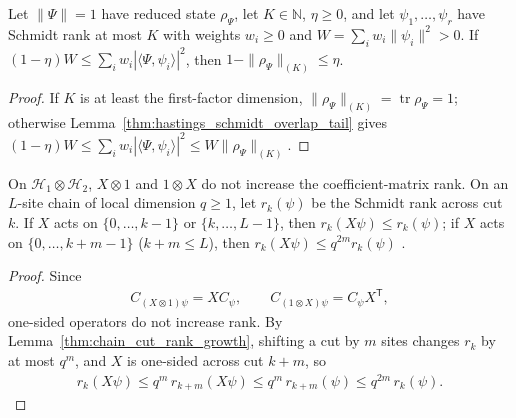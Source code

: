 \begin{lemma}
    \label{thm:hastings_mixture_tail}
    \leanok
    Let $\|\Psi\|=1$ have reduced state $\rho_\Psi$, let $K\in\mathbb N$,
    $\eta\ge0$, and let $\psi_1,\dots,\psi_r$ have Schmidt rank at most $K$ with
    weights $w_i\ge0$ and $W=\sum_iw_i\|\psi_i\|^2>0$. If
    $(1-\eta)W\le\sum_iw_i|\langle\Psi,\psi_i\rangle|^2$, then
    $1-\|\rho_\Psi\|_{(K)}\le\eta$.
\end{lemma}
\begin{proof}\leanok
    If $K$ is at least the first-factor dimension,
    $\|\rho_\Psi\|_{(K)}=\operatorname{tr}\rho_\Psi=1$; otherwise
    Lemma~\ref{thm:hastings_schmidt_overlap_tail} gives
    $(1-\eta)W\le\sum_iw_i|\langle\Psi,\psi_i\rangle|^2\le W\|\rho_\Psi\|_{(K)}$.
\end{proof}

\begin{lemma}
    \label{thm:hastings_supported_cut_rank}
    \leanok
    On $\mathcal H_1\otimes\mathcal H_2$, $X\otimes1$ and $1\otimes X$ do not
    increase the coefficient-matrix rank. On an $L$-site chain of local
    dimension $q\ge1$, let $r_k(\psi)$ be the Schmidt rank across cut $k$. If
    $X$ acts on $\{0,\dots,k-1\}$ or $\{k,\dots,L-1\}$, then
    $r_k(X\psi)\le r_k(\psi)$; if $X$ acts on $\{0,\dots,k+m-1\}$ ($k+m\le L$),
    then $r_k(X\psi)\le q^{2m}r_k(\psi)$
    \cite[Lemma~2, lines 321--322]{Hastings2007AreaLaw}.
\end{lemma}
\begin{proof}\leanok
    Since
    \begin{align}
        C_{(X\otimes1)\psi}=XC_\psi,\qquad C_{(1\otimes X)\psi}=C_\psi X^{\mathsf T},
        \label{eq:hastings_supported_cut_rank_one_sided}
    \end{align}
    one-sided operators do not increase rank. By
    Lemma~\ref{thm:chain_cut_rank_growth}, shifting a cut by $m$ sites changes
    $r_k$ by at most $q^m$, and $X$ is one-sided across cut $k+m$, so
    \begin{align}
        r_k(X\psi)\le q^m\,r_{k+m}(X\psi)\le q^m\,r_{k+m}(\psi)
        \le q^{2m}\,r_k(\psi).
        \label{eq:hastings_supported_cut_rank_shift}
    \end{align}
\end{proof}

